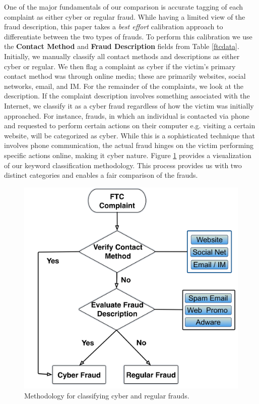 \documentclass[conference]{IEEEtran}
\begin{document}
One of the major fundamentals of our comparison is accurate tagging of each complaint as either cyber or regular fraud. While having a limited view of the fraud description, this paper takes a \emph{best effort} calibration approach to differentiate between the two types of frauds. To perform this calibration we use the \textbf{Contact Method} and \textbf{Fraud Description} fields from Table \ref{ftcdata}. Initially, we manually classify all contact methods and descriptions as either cyber or regular. We then flag a complaint as cyber if the victim's primary contact method was through online media; these are primarily websites, social networks, email, and IM. For the remainder of the complaints, we look at the description. If the complaint description involves something associated with the Internet, we classify it as a cyber fraud regardless of how the victim was initially approached. For instance, frauds, in which an individual is contacted via phone and requested to perform certain actions on their computer e.g. visiting a certain website, will be categorized as cyber. While this is a sophisticated technique that involves phone communication, the actual fraud hinges on the victim performing specific actions online, making it cyber nature. Figure \ref{classify} provides a visualization of our keyword classification methodology. This process provides us with two distinct categories and enables a fair comparison of the frauds.   

\begin{figure}[t]
\centering
  \includegraphics[scale=0.28]{graphics/methodology.png}
  \caption{Methodology for classifying cyber and regular frauds.}
  \label{classify}
\end{figure}
\end{document}
